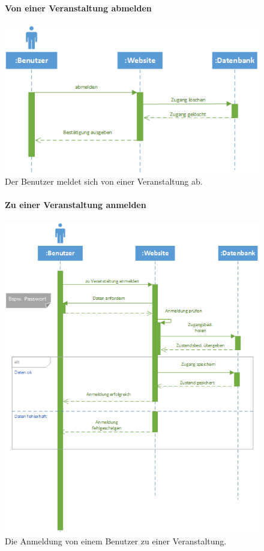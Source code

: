 \documentclass[12pt,a4paper]{article}
\begin{document}
\begin{figure}[H]
	\centering
	\paragraph{Von einer Veranstaltung abmelden}
	\includegraphics[width=\textwidth]{Bilder/Sequenzdiagramme/VonVeranstaltungAbmelden.png}
	\caption{Der Benutzer meldet sich von einer Veranstaltung ab.}
	\label{SzVonVeranstaltungAbmelden}
\end{figure}
\begin{figure}[H]
	\centering
	\paragraph{Zu einer Veranstaltung anmelden}
	\includegraphics[width=\textwidth]{Bilder/Sequenzdiagramme/ZuVeranstaltungAnmelden.png}
	\caption{Die Anmeldung von einem Benutzer zu einer Veranstaltung.}
	\label{SzZuVeranstaltungAnmelden}
\end{figure}
\end{document}
